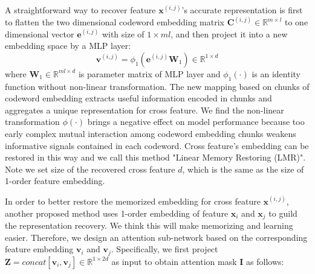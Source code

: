 \documentclass[sigconf,authorversion]{acmart}
\begin{document}
A straightforward way to recover feature $\mathbf{x}^{(i,j)}$'s accurate representation is first to flatten the two dimensional codeword embedding matrix $\mathbf{C}^{(i,j)}\in \mathbb{R}^{m \times l}$ to one dimensional vector $\mathbf{e}^{(i,j)}$ with size of $1 \times ml $, and then project it into a new embedding space by a MLP layer:
\begin{equation}
        \mathbf{v}^{(i,j)} = \phi_1(\mathbf{e}^{(i,j)}\mathbf{W}_{1})\in \mathbb{R}^{ 1\times d}
 \end{equation}
where  $\mathbf{W}_1 \in \mathbb{R}^{ ml\times d} $ is parameter matrix of MLP layer and $\phi_1(\cdot)$ is an identity function without non-linear transformation. The new mapping based on chunks of codeword embedding extracts useful information encoded in chunks and aggregates a unique representation for cross feature. We find the non-linear transformation $\phi(\cdot)$ brings a negative effect on model performance because too early complex mutual interaction among codeword embedding chunks weakens informative signals contained in each codeword. 
Cross feature's embedding can be restored in this way and we call this method "Linear Memory Restoring (LMR)". Note we set size of the recovered cross feature  $d $, which is the same as the size of 1-order feature embedding.

In order to better restore the memorized embedding for cross feature $\mathbf{x}^{(i,j)}$, another proposed method uses  1-order embedding of feature $\mathbf{x}_i$ and $\mathbf{x}_j$ to guild the representation recovery. We think this will make memorizing and learning easier. Therefore, we design an attention sub-network based on the corresponding feature embedding $\mathbf{v}_i$ and $\mathbf{v}_j$. Specifically,  we first project $\mathbf{Z}=concat[\mathbf{v}_i,\mathbf{v}_j]\in \mathbb{R}^{1\times 2d}$ as input to obtain attention mask $\mathbf{I}$ as follows:
\end{document}

